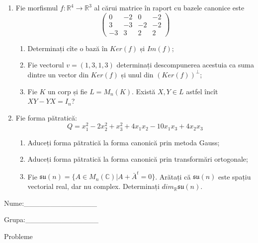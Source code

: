 \documentclass{article}
\begin{document}
\begin{enumerate}
 \item Fie morfismul $f:\mathbb{R}^4 \to \mathbb{R}^3$ al cărui matrice în raport cu bazele canonice este
$$\begin{pmatrix}
0&-2&0&-2\\
3&-3&-2&-2\\
-3&3&2&2
\end{pmatrix}$$

\begin{enumerate}
\item Determinați cîte o bază în $Ker(f)$ și $Im(f)$;
\item Fie vectorul $v=(1,3,1,3)$ determinați descompunerea acestuia ca suma dintre un vector din $Ker(f)$ și unul din $(Ker(f))^\perp$;
\item Fie $K$ un corp și fie $L=M_n(K)$. Există $X,Y \in L$ astfel încît $XY-YX=I_n$?  
\end{enumerate}
\item Fie forma pătratică:
$$Q= x_1^2-2x_2^2+x_3^2+4x_1x_2-10x_1x_3+4x_2x_3$$

\begin{enumerate}
\item Aduceți forma pătratică la forma canonică prin metoda Gauss;
\item Aduceți forma pătratică la forma canonică prin transformări ortogonale;
\item Fie $\mathfrak{su}(n)=\{ A \in M_n(\mathbb{C}) | A+\bar{A}^t=0\}$. Arătați că $\mathfrak{su}(n)$ este spațiu vectorial real, dar nu complex.
Determinați $dim_{\mathbb{R}}\mathfrak{su}(n)$.
\end{enumerate}
\end{enumerate}
\newpage
\begin{flushright}
Nume:\_\_\_\_\_\_\_\_\_\_\_\_\_\_
 
 
Grupa:\_\_\_\_\_\_\_\_\_\_\_\_\_\_
\end{flushright}
\begin{center}
\vspace{2cm}
{\Large Probleme}
\vspace{2cm}
\end{center}
\end{document}

